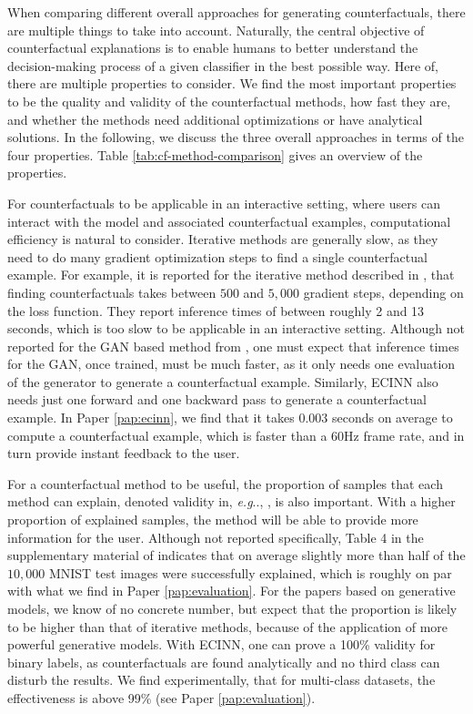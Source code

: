 \documentclass[11pt,a4paper,twoside,openright,final]{memoir}
\makeatletter
\DeclareRobustCommand\onedot{\futurelet\@let@token\@onedot}
\def\@onedot{\ifx\@let@token.\else.\null\fi\xspace}
\def\eg{\emph{e.g}\onedot} \def\Eg{\emph{E.g}\onedot}
\newcommand*{\paperref}[1]{Paper \hyperref[#1]{\ref{#1}}}
\makeatother
\begin{document}
When comparing different overall approaches for generating counterfactuals, there are multiple things to take into account.
Naturally, the central objective of counterfactual explanations is to enable humans to better understand the decision-making process of a given classifier in the best possible way.
Here of, there are multiple properties to consider.
We find the most important properties to be the quality and validity of the counterfactual methods, how fast they are, and whether the methods need additional optimizations or have analytical solutions.
In the following, we discuss the three overall approaches in terms of the four properties.
Table \ref{tab:cf-method-comparison} gives an overview of the properties.

For counterfactuals to be applicable in an interactive setting, where users can interact with the model and associated counterfactual examples, computational efficiency is natural to consider.
Iterative methods are generally slow, as they need to do many gradient optimization steps to find a single counterfactual example.
For example, it is reported for the iterative method described in \cite{VanLooveren2019}, that finding counterfactuals takes between $500$ and $5,000$ gradient steps, depending on the loss function. 
They report inference times of between roughly 2 and 13 seconds, which is too slow to be applicable in an interactive setting.
Although not reported for the GAN based method from \cite{Singla2019}, one must expect that inference times for the GAN, once trained, must be much faster, as it only needs one evaluation of the generator to generate a counterfactual example.
Similarly, ECINN also needs just one forward and one backward pass to generate a counterfactual example.
In \paperref{pap:ecinn}, we find that it takes $0.003$ seconds on average to compute a counterfactual example, which is faster than a 60Hz frame rate, and in turn provide instant feedback to the user.

For a counterfactual method to be useful, the proportion of samples that each method can explain, denoted validity in, \eg, \cite{Mothilal2020}, is also important.
With a higher proportion of explained samples, the method will be able to provide more information for the user.
Although not reported specifically, Table 4 in the supplementary material of \citet{VanLooveren2019} indicates that on average slightly more than half of the $10,000$ MNIST test images were successfully explained, which is roughly on par with what we find in \paperref{pap:evaluation}.
For the papers based on generative models, we know of no concrete number, but expect that the proportion is likely to be higher than that of iterative methods, because of the application of more powerful generative models. 
With ECINN, one can prove a 100\% validity for binary labels, as counterfactuals are found analytically and no third class can disturb the results. 
We find experimentally, that for multi-class datasets, the effectiveness is above 99\% (see \paperref{pap:evaluation}). 
\end{document}
